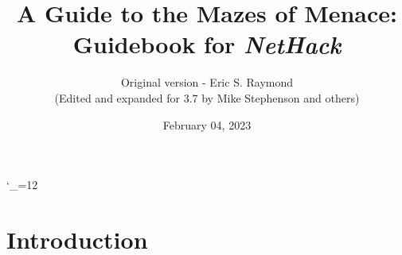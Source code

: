 \textheight 220mm
\textwidth 160mm
\oddsidemargin 0mm
\evensidemargin 0mm
\topmargin 0mm

\newcommand{\nd}{\noindent}

\newcommand{\tb}[1]{\tt #1 \hfill}
\newcommand{\bb}[1]{\bf #1 \hfill}
\newcommand{\ib}[1]{\it #1 \hfill}

\newcommand{\blist}[1]
{\begin{list}{$\bullet$}
    {\leftmargin 30mm \topsep 2mm \partopsep 0mm \parsep 0mm \itemsep 1mm
     \labelwidth 28mm \labelsep 2mm
     #1}}

\newcommand{\elist}{\end{list}}

\catcode`\_=12


%
%

\title{\LARGE A Guide to the Mazes of Menace:\\
\Large Guidebook for {\it NetHack\/}}

\author{Original version - Eric S. Raymond\\
(Edited and expanded for 3.7 by Mike Stephenson and others)}
\date{February 04, 2023}

\maketitle

\section{Introduction}


